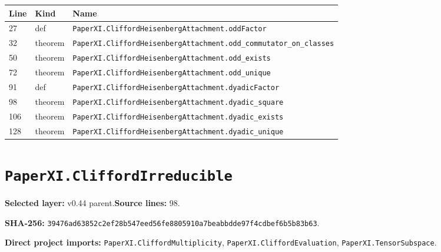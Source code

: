 \documentclass[10pt,oneside]{book}
\begin{document}
\begin{longtable}{@{}p{}p{}p{}@{}}\toprule Line&Kind&Name\\\midrule\endhead

27&def&\nolinkurl{PaperXI.CliffordHeisenbergAttachment.oddFactor}\\

32&theorem&\nolinkurl{PaperXI.CliffordHeisenbergAttachment.odd_commutator_on_classes}\\

50&theorem&\nolinkurl{PaperXI.CliffordHeisenbergAttachment.odd_exists}\\

72&theorem&\nolinkurl{PaperXI.CliffordHeisenbergAttachment.odd_unique}\\

91&def&\nolinkurl{PaperXI.CliffordHeisenbergAttachment.dyadicFactor}\\

98&theorem&\nolinkurl{PaperXI.CliffordHeisenbergAttachment.dyadic_square}\\

106&theorem&\nolinkurl{PaperXI.CliffordHeisenbergAttachment.dyadic_exists}\\

128&theorem&\nolinkurl{PaperXI.CliffordHeisenbergAttachment.dyadic_unique}\\

\bottomrule\end{longtable}

\section{\texorpdfstring{\nolinkurl{PaperXI.CliffordIrreducible}}{PaperXI.CliffordIrreducible}}\label{module:PaperXI.CliffordIrreducible}

\textbf{Selected layer:} v0.44 parent.\quad\textbf{Source lines:} 98.\par\textbf{SHA-256:} {\scriptsize\nolinkurl{39476ad63852c2ef28b547eed56fe8805910a7beabbdde97f4cdbef6b5b83b63}}.


\textbf{Direct project imports:} \nolinkurl{PaperXI.CliffordMultiplicity}, \nolinkurl{PaperXI.CliffordEvaluation}, \nolinkurl{PaperXI.TensorSubspace}.
\end{document}

